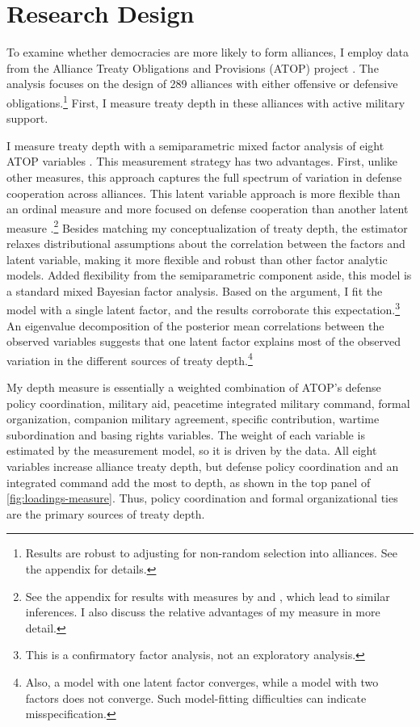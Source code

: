 \documentclass[12pt]{article}
\begin{document}
\section{Research Design}



To examine whether democracies are more likely to form alliances, I employ data from the Alliance Treaty Obligations and Provisions (ATOP) project \citep{Leedsetal2002}. 
The analysis focuses on the design of 289 alliances with either offensive or defensive obligations.\footnote{Results are robust to adjusting for non-random selection into alliances. See the appendix for details.}
First, I measure treaty depth in these alliances with active military support. 


I measure treaty depth with a semiparametric mixed factor analysis of eight ATOP variables \citep{Murrayetal2013}.
This measurement strategy has two advantages. 
First, unlike other measures, this approach captures the full spectrum of variation in defense cooperation across alliances.
This latent variable approach is more flexible than an ordinal measure \citep{LeedsAnac2005} and more focused on defense cooperation than another latent measure \citep{BensonClinton2016}.\footnote{See the appendix for results with measures by \citet{LeedsAnac2005} and \citet{BensonClinton2016}, which lead to similar inferences. I also discuss the relative advantages of my measure in more detail.}
Besides matching my conceptualization of treaty depth, the estimator relaxes distributional assumptions about the correlation between the factors and latent variable, making it more flexible and robust than other factor analytic models. 
Added flexibility from the semiparametric component aside, this model is a standard mixed Bayesian factor analysis. 
Based on the argument, I fit the model with a single latent factor, and the results corroborate this expectation.\footnote{This is a confirmatory factor analysis, not an exploratory analysis.}
An eigenvalue decomposition of the posterior mean correlations between the observed variables suggests that one latent factor explains most of the observed variation in the different sources of treaty depth.\footnote{Also, a model with one latent factor converges, while a model with two factors does not converge. Such model-fitting difficulties can indicate misspecification.} 


My depth measure is essentially a weighted combination of ATOP's defense policy coordination, military aid, peacetime integrated military command, formal organization, companion military agreement, specific contribution, wartime subordination and basing rights variables.
The weight of each variable is estimated by the measurement model, so it is driven by the data.  
All eight variables increase alliance treaty depth, but defense policy coordination and an integrated command add the most to depth, as shown in the top panel of \autoref{fig:loadings-measure}. 
Thus, policy coordination and formal organizational ties are the primary sources of treaty depth. 
\end{document}
